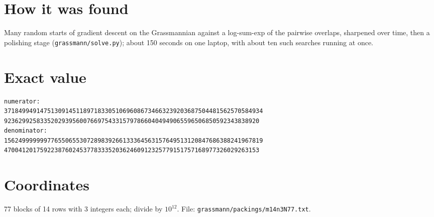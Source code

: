 \documentclass[11pt,a4paper]{article}
\begin{document}
\section{How it was found}
Many random starts of gradient descent on the Grassmannian against a log-sum-exp of the pairwise overlaps, sharpened over time, then a polishing stage (\texttt{grassmann/solve.py}); about 150 seconds on one laptop, with about ten such searches running at once.


\appendix
\section{Exact value}
{\small
\begin{verbatim}
numerator:
371849949147513091451189718330510696086734663239203687504481562570584934
92362992583352029395600766975433157978660404949065596506850592343838920
denominator:
156249999999776550655307289839266133364563157649513120847686388241967819
47004120175922387602453778333520362460912325779151757168977326029263153
\end{verbatim}}

\section{Coordinates}
77 blocks of 14 rows with 3 integers each; divide by $10^{12}$. File: \texttt{grassmann/packings/m14n3N77.txt}.
{\tiny
\begin{multicols}{3}
\end{multicols}}
\end{document}
